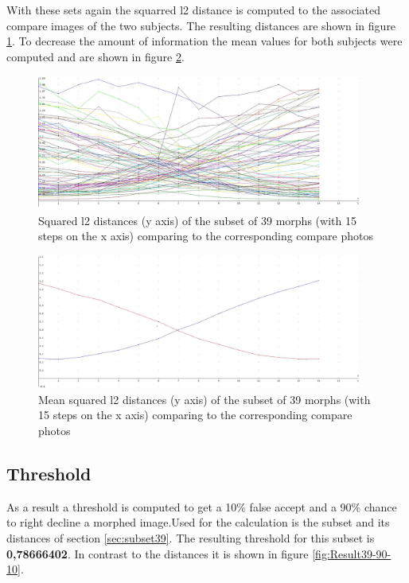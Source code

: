 With these sets again the squarred l2 distance is computed to the associated compare images of the two subjects. The resulting distances are shown in figure \ref{fig:Result39-all}. To decrease the amount of information the mean values for both subjects were computed and are shown in figure \ref{fig:Result39-mean}.
\begin{figure}[htbp] 
	\centering
		\includegraphics[width=0.95\textwidth]{Resources/result39-all.jpg}
	\caption{Squared l2 distances (y axis) of the subset of 39 morphs (with 15 steps on the x axis) comparing to the corresponding compare photos}
	\label{fig:Result39-all}
\end{figure}
\begin{figure}[htbp] 
	\centering
		\includegraphics[width=0.95\textwidth]{Resources/result39-mean.jpg}
	\caption{Mean squared l2 distances (y axis) of the subset of 39 morphs (with 15 steps on the x axis) comparing to the corresponding compare photos}
	\label{fig:Result39-mean}
\end{figure}
\newpage
\subsection{Threshold}
As a result a threshold is computed to get a 10\% false accept and a 90\% chance to right decline a morphed image.Used for the calculation is the subset and its distances of section \ref{sec:subset39}.
The resulting threshold for this subset is \textbf{0,78666402}. In contrast to the distances it is shown in figure \ref{fig:Result39-90-10}.



